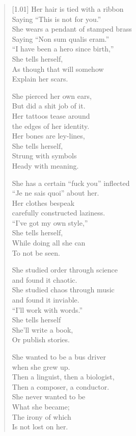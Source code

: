 \begin{verse}[1.01\textwidth]
Her hair is tied with a ribbon\\
\vin Saying ``This is not for you.''\\
She wears a pendant of stamped brass\\
\vin Saying ``Non sum qualis eram.''\\
``I have been a hero since birth,''\\
\vin She tells herself,\\
\vin \vin As though that will somehow\\
\vin \vin \vin Explain her scars.

She pierced her own ears,\\
\vin But did a shit job of it.\\
Her tattoos tease around\\
\vin the edges of her identity.\\
Her bones are ley-lines,\\
\vin She tells herself,\\
\vin \vin Strung with symbols\\
\vin \vin \vin Heady with meaning.

She has a certain ``fuck you'' inflected\\
\vin ``Je ne sais quoi'' about her.\\
Her clothes bespeak\\
\vin carefully constructed laziness.\\
``I've got my own style,''\\
\vin She tells herself,\\
\vin \vin While doing all she can\\
\vin \vin \vin To not be seen.
\newpage
\null
\vspace{1cm}

She studied order through science\\
\vin and found it chaotic.\\
She studied chaos through music\\
\vin and found it inviable.\\
``I'll work with words.''\\
\vin She tells herself\\
\vin \vin She'll write a book,\\
\vin \vin \vin Or publish stories.

She wanted to be a bus driver\\
\vin when she grew up.\\
Then a linguist, then a biologist,\\
\vin Then a composer, a conductor.\\
She never wanted to be\\
\vin What she became;\\
\vin \vin The irony of which\\
\vin \vin \vin Is not lost on her.
\end{verse}
